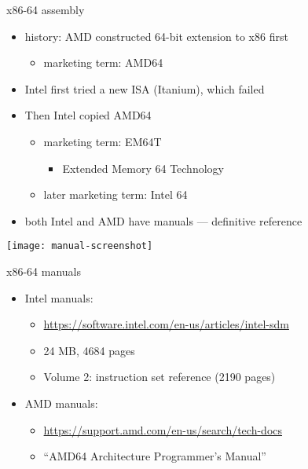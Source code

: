 \begin{frame}{x86-64 assembly}
\begin{itemize}
\item history: AMD constructed 64-bit extension to x86 first
    \begin{itemize}
    \item marketing term: AMD64
    \end{itemize}
\item Intel first tried a new ISA (Itanium), which failed
\item Then Intel copied AMD64
    \begin{itemize}
    \item marketing term: EM64T
        \begin{itemize}\item Extended Memory 64 Technology\end{itemize}
    \item later marketing term: Intel 64
    \end{itemize}
\item both Intel and AMD have manuals --- definitive reference
\end{itemize}
\end{frame}

\begin{frame}
\texttt{[image: manual-screenshot]}
\end{frame}

\begin{frame}{x86-64 manuals}
\begin{itemize}
\item Intel manuals:
    \begin{itemize}
    \item \small \url{https://software.intel.com/en-us/articles/intel-sdm}
    \item 24 MB, 4684 pages
    \item Volume 2: instruction set reference (2190 pages)
    \end{itemize}
\item AMD manuals:
    \begin{itemize}
    \item \small \url{https://support.amd.com/en-us/search/tech-docs}
    \item ``AMD64 Architecture Programmer's Manual''
    \end{itemize}
\end{itemize}
\end{frame}

